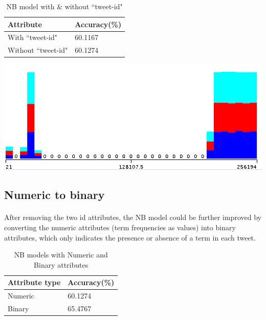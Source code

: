 \documentclass[11pt]{article}
\begin{document}
\begin{table}[!htbp]
 \begin{center}
\begin{tabular}{| l | l |}
      \hline
      Attribute & Accuracy(\%) \\
      \hline\hline
      With ``tweet-id" & 60.1167 \\
      Without ``tweet-id" & 60.1274 \\
      \hline
\end{tabular}
\caption{NB model with \& without ``tweet-id"}\label{table2}
 \end{center}
\end{table}

\includegraphics[scale=0.4]{"tid-class"}

\subsection{Numeric to binary}

\paragraph{} After removing the two id attributes, the NB model could be further improved by converting the numeric attributes (term frequencies as values) into binary attributes, which only indicates the presence or absence of a term in each tweet.
\begin{table}[!htbp]
 \begin{center}
\begin{tabular}{| l | l |}
      \hline
      Attribute type & Accuracy(\%) \\
      \hline\hline
      Numeric & 60.1274 \\
      Binary & 65.4767 \\
      \hline
\end{tabular}
\caption{NB models with Numeric and Binary attributes}\label{table3}
 \end{center}
\end{table}
\end{document}
